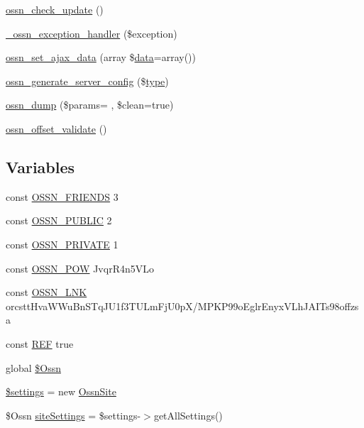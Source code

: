 \begin{DoxyCompactItemize}
\item 
\hyperlink{ossn_8lib_8system_8php_a9309fab8191ac059d3252b43f73a1e51}{ossn\+\_\+check\+\_\+update} ()
\item 
\hyperlink{ossn_8lib_8system_8php_ab43d98aa13c11a4781ad7ce3019417ee}{\+\_\+ossn\+\_\+exception\+\_\+handler} (\$exception)
\item 
\hyperlink{ossn_8lib_8system_8php_a5e406f0ddcf4fb1951f54f6d6589f4b0}{ossn\+\_\+set\+\_\+ajax\+\_\+data} (array \$\hyperlink{components_2_ossn_comments_2actions_2comment_2edit_8php_a2b67189b42ab547221cb2a6408f4746a}{data}=array())
\item 
\hyperlink{ossn_8lib_8system_8php_a4e188f1c1b42e3b3d2fd13871f777301}{ossn\+\_\+generate\+\_\+server\+\_\+config} (\$\hyperlink{_ossn_wall_2actions_2wall_2post_2group_8php_a2dc1bb4e1ed0029daa81ac0776b14b51}{type})
\item 
\hyperlink{ossn_8lib_8system_8php_a1b92edc2b42dd69b000855931a114330}{ossn\+\_\+dump} (\$params= \textquotesingle{}\textquotesingle{}, \$clean=true)
\item 
\hyperlink{ossn_8lib_8system_8php_a774d23cb9086aac093fb9aed5c2c5727}{ossn\+\_\+offset\+\_\+validate} ()
\end{DoxyCompactItemize}
\subsection*{Variables}
\begin{DoxyCompactItemize}
\item 
const \hyperlink{ossn_8lib_8system_8php_a524966d71b147c822336d02f87ab9ece}{O\+S\+S\+N\+\_\+\+F\+R\+I\+E\+N\+DS} 3
\item 
const \hyperlink{ossn_8lib_8system_8php_a8efdc824fa9025d0c02ee7c512aafdfa}{O\+S\+S\+N\+\_\+\+P\+U\+B\+L\+IC} 2
\item 
const \hyperlink{ossn_8lib_8system_8php_a982684c5e83907832c9079348ec7edd3}{O\+S\+S\+N\+\_\+\+P\+R\+I\+V\+A\+TE} 1
\item 
const \hyperlink{ossn_8lib_8system_8php_a7ba2afbd07c02fae36bef2c629556446}{O\+S\+S\+N\+\_\+\+P\+OW} \textquotesingle{}Jvqr\+R4n5\+V\+Lo\textquotesingle{}
\item 
const \hyperlink{ossn_8lib_8system_8php_a8055fb49b3bb3a37d8d9d5f037d196c3}{O\+S\+S\+N\+\_\+\+L\+NK} \textquotesingle{}orcstt\+Hva\+W\+Wu\+Bn\+S\+Tq\+J\+U1f3\+T\+U\+Lm\+Fj\+U0pX/M\+P\+K\+P99o\+Eglr\+Enyx\+V\+Lh\+J\+A\+I\+Ts98offzsa\textquotesingle{}
\item 
const \hyperlink{ossn_8lib_8system_8php_a6141904c50990cdd468f07046f29bb5c}{R\+EF} true
\item 
global \hyperlink{ossn_8lib_8system_8php_ac8d5754c40045706a2dad0ab99d725a8}{\$\+Ossn}
\item 
\hyperlink{ossn_8lib_8system_8php_ac7c3353107070daa85f641882931b358}{\$settings} = new \hyperlink{class_ossn_site}{Ossn\+Site}
\item 
\$Ossn \hyperlink{ossn_8lib_8system_8php_a4fa0e9ed8e9f90f5c0e8a852d868a8eb}{site\+Settings} = \$settings-\/$>$get\+All\+Settings()
\end{DoxyCompactItemize}


